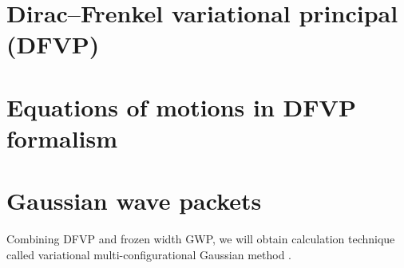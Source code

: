 \documentclass[a4paper,14pt]{extarticle}
\begin{document}
\section{Dirac--Frenkel variational principal (DFVP)}




\section{Equations of motions in DFVP formalism}



\section{Gaussian wave packets}



Combining DFVP and frozen width GWP, we will obtain calculation technique called variational multi-configurational Gaussian method \cite{vmcg}.



\end{document}
